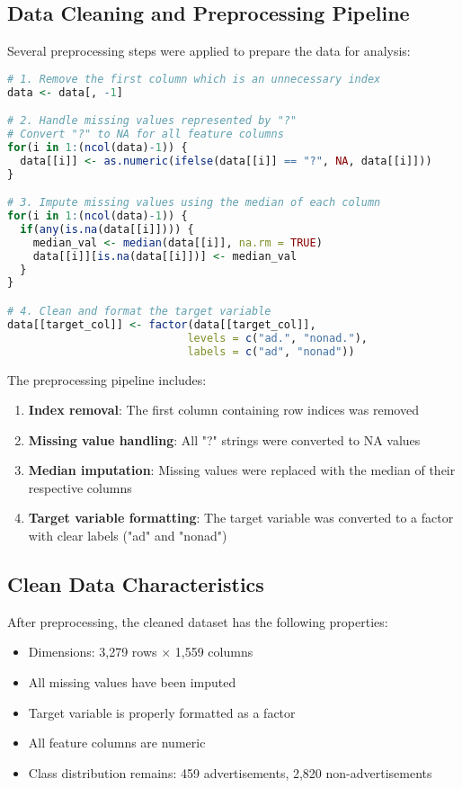 \subsection{Data Cleaning and Preprocessing Pipeline}
Several preprocessing steps were applied to prepare the data for analysis:

\begin{lstlisting}[language=R]
# 1. Remove the first column which is an unnecessary index
data <- data[, -1]

# 2. Handle missing values represented by "?"
# Convert "?" to NA for all feature columns
for(i in 1:(ncol(data)-1)) {
  data[[i]] <- as.numeric(ifelse(data[[i]] == "?", NA, data[[i]]))
}

# 3. Impute missing values using the median of each column
for(i in 1:(ncol(data)-1)) {
  if(any(is.na(data[[i]]))) {
    median_val <- median(data[[i]], na.rm = TRUE)
    data[[i]][is.na(data[[i]])] <- median_val
  }
}

# 4. Clean and format the target variable
data[[target_col]] <- factor(data[[target_col]], 
                            levels = c("ad.", "nonad."), 
                            labels = c("ad", "nonad"))
\end{lstlisting}

The preprocessing pipeline includes:
\begin{enumerate}
    \item \textbf{Index removal}: The first column containing row indices was removed
    \item \textbf{Missing value handling}: All "?" strings were converted to NA values
    \item \textbf{Median imputation}: Missing values were replaced with the median of their respective columns
    \item \textbf{Target variable formatting}: The target variable was converted to a factor with clear labels ("ad" and "nonad")
\end{enumerate}

\subsection{Clean Data Characteristics}
After preprocessing, the cleaned dataset has the following properties:
\begin{itemize}
    \item Dimensions: 3,279 rows × 1,559 columns
    \item All missing values have been imputed
    \item Target variable is properly formatted as a factor
    \item All feature columns are numeric
    \item Class distribution remains: 459 advertisements, 2,820 non-advertisements
\end{itemize}

